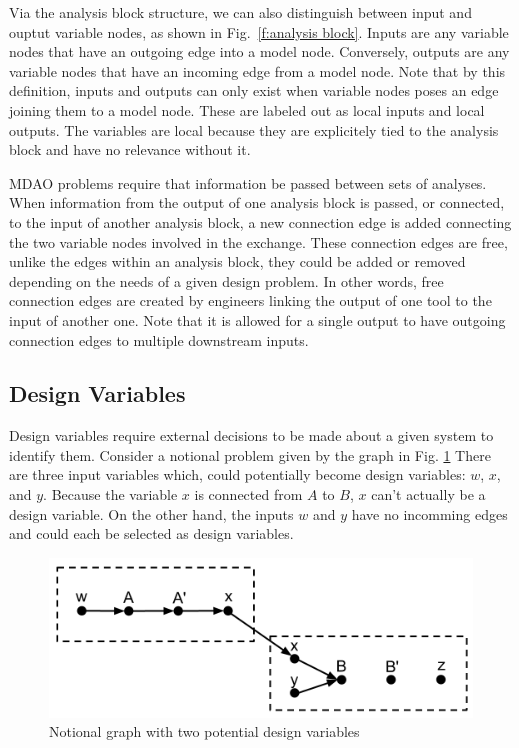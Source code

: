 Via the analysis block structure, we can also distinguish between input and ouptut
variable nodes, as shown in Fig.~\ref{f:analysis block}. Inputs are any variable nodes that have an outgoing edge into a model 
node. Conversely, outputs are any variable nodes that have an incoming edge from a model node. 
Note that by this definition, inputs and outputs can only exist when variable nodes poses an 
edge joining them to a model node. These are labeled out as 
local inputs and local outputs. The variables are local because they are explicitely tied
to the analysis block and have no relevance without it. 

MDAO problems require that information be passed between sets of analyses. When 
information from the output of one analysis block is passed, or connected, to the 
input of another analysis block, a new connection edge is added connecting the two 
variable nodes involved in the exchange. These connection edges are free, unlike the edges 
within an analysis block, they could be added or removed depending on the needs
of a given design problem. In other words, free connection edges are created by 
engineers linking the output of one tool to the input of another one. Note that 
it is allowed for a single output to have outgoing connection edges to multiple 
downstream inputs. 

\subsection{Design Variables}
Design variables require external decisions 
to be made about a given system to identify them. Consider 
a notional problem given by the graph in Fig. \ref{f:designvars} There are three input variables 
which, could potentially become design variables: $w$, $x$, and $y$. Because the variable $x$ is connected from $A$ to $B$,
 $x$ can't actually be a design variable. On the other hand, the inputs $w$ and $y$
have no incomming edges and could each be selected as design variables. 
\begin{figure}[htb!]
  \begin{center}
    \includegraphics[width=.6\textwidth]{images/design_vars_graph}
  \end{center}
  \caption{Notional graph with two potential design variables \label{f:designvars}}
\end{figure}

